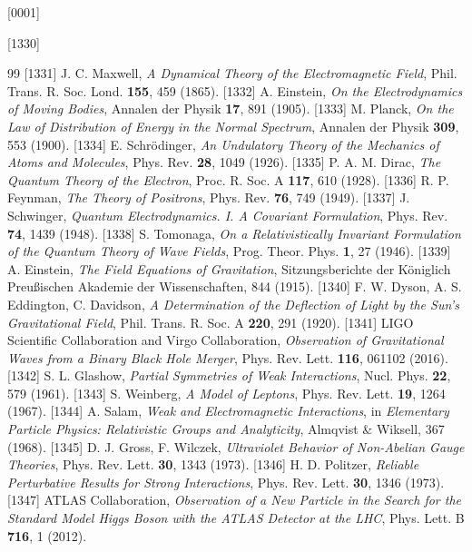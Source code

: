 [0001] \documentclass[12pt]{report}
[0002] \usepackage[utf8]{inputenc}
\begin{document}
[1330] \begin{thebibliography}{99}
[1331]  J. C. Maxwell, \textit{A Dynamical Theory of the Electromagnetic Field}, Phil. Trans. R. Soc. Lond. \textbf{155}, 459 (1865).
[1332]  A. Einstein, \textit{On the Electrodynamics of Moving Bodies}, Annalen der Physik \textbf{17}, 891 (1905).
[1333]  M. Planck, \textit{On the Law of Distribution of Energy in the Normal Spectrum}, Annalen der Physik \textbf{309}, 553 (1900).
[1334]  E. Schrödinger, \textit{An Undulatory Theory of the Mechanics of Atoms and Molecules}, Phys. Rev. \textbf{28}, 1049 (1926).
[1335]  P. A. M. Dirac, \textit{The Quantum Theory of the Electron}, Proc. R. Soc. A \textbf{117}, 610 (1928).
[1336]  R. P. Feynman, \textit{The Theory of Positrons}, Phys. Rev. \textbf{76}, 749 (1949).
[1337]  J. Schwinger, \textit{Quantum Electrodynamics. I. A Covariant Formulation}, Phys. Rev. \textbf{74}, 1439 (1948).
[1338]  S. Tomonaga, \textit{On a Relativistically Invariant Formulation of the Quantum Theory of Wave Fields}, Prog. Theor. Phys. \textbf{1}, 27 (1946).
[1339]  A. Einstein, \textit{The Field Equations of Gravitation}, Sitzungsberichte der Königlich Preußischen Akademie der Wissenschaften, 844 (1915).
[1340]  F. W. Dyson, A. S. Eddington, C. Davidson, \textit{A Determination of the Deflection of Light by the Sun's Gravitational Field}, Phil. Trans. R. Soc. A \textbf{220}, 291 (1920).
[1341]  LIGO Scientific Collaboration and Virgo Collaboration, \textit{Observation of Gravitational Waves from a Binary Black Hole Merger}, Phys. Rev. Lett. \textbf{116}, 061102 (2016).
[1342]  S. L. Glashow, \textit{Partial Symmetries of Weak Interactions}, Nucl. Phys. \textbf{22}, 579 (1961).
[1343]  S. Weinberg, \textit{A Model of Leptons}, Phys. Rev. Lett. \textbf{19}, 1264 (1967).
[1344]  A. Salam, \textit{Weak and Electromagnetic Interactions}, in \textit{Elementary Particle Physics: Relativistic Groups and Analyticity}, Almqvist & Wiksell, 367 (1968).
[1345]  D. J. Gross, F. Wilczek, \textit{Ultraviolet Behavior of Non-Abelian Gauge Theories}, Phys. Rev. Lett. \textbf{30}, 1343 (1973).
[1346]  H. D. Politzer, \textit{Reliable Perturbative Results for Strong Interactions}, Phys. Rev. Lett. \textbf{30}, 1346 (1973).
[1347]  ATLAS Collaboration, \textit{Observation of a New Particle in the Search for the Standard Model Higgs Boson with the ATLAS Detector at the LHC}, Phys. Lett. B \textbf{716}, 1 (2012).

\end{thebibliography}
\end{document}
